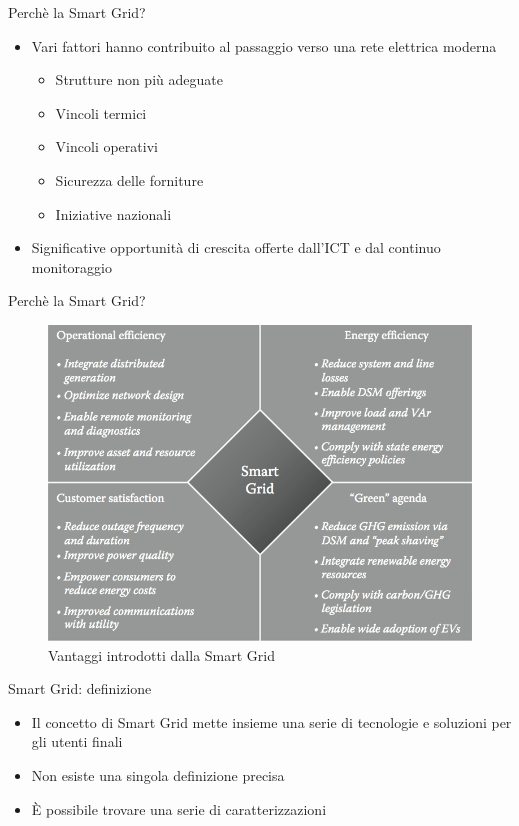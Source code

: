 \begin{frame}{Perchè la Smart Grid?}
	\begin{itemize}[<+- | alert@+>]
	\item Vari fattori hanno contribuito al passaggio verso una rete elettrica moderna
	 \begin{itemize}
	  	\item Strutture non più adeguate
	  	\item Vincoli termici
	  	\item Vincoli operativi
	  	\item Sicurezza delle forniture
	  	\item Iniziative nazionali
	 \end{itemize}
	\item Significative opportunità di crescita offerte dall'ICT e dal continuo monitoraggio
	\end{itemize}
\end{frame}


\begin{frame}{Perchè la Smart Grid?}
	\begin{figure}[h] 
		\includegraphics[scale=0.25]{imgs/benefits.png}
		\caption{Vantaggi introdotti dalla Smart Grid}
	\end{figure}
\end{frame}


\begin{frame}{Smart Grid: definizione}
\begin{itemize}[<+- | alert@+>]
\item Il concetto di Smart Grid mette insieme una serie di tecnologie e soluzioni per gli utenti finali
\item Non esiste una singola definizione precisa
\item È possibile trovare una serie di caratterizzazioni
\end{itemize}
\end{frame}

